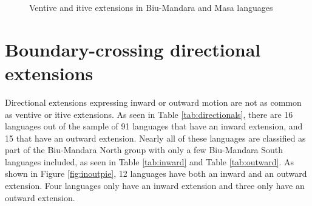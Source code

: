 \begin{figure}
	\caption{Ventive and itive extensions in Biu-Mandara and Masa languages}
	\label{fig:ventiveitivepie}
\end{figure}


\section{Boundary-crossing directional extensions} \label{sec:bounded2}


Directional extensions expressing inward or outward motion are not as common as ventive or itive extensions. As seen in Table \ref{tab:directionals}, there are 16 languages out of the sample of 91 languages that have an inward extension, and 15 that have an outward extension. Nearly all of these languages are classified as part of the Biu-Mandara North group with only a few Biu-Mandara South languages included, as seen in Table \ref{tab:inward} and Table \ref{tab:outward}. As shown in Figure \ref{fig:inoutpie}, 12 languages have both an inward and an outward extension. Four languages only have an inward extension and three only have an outward extension. %

